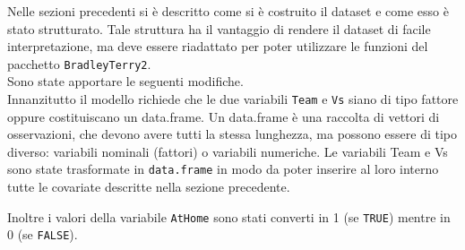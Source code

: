 Nelle sezioni precedenti si è descritto come si è costruito il dataset e come esso è stato strutturato. Tale struttura ha il vantaggio di rendere il dataset di facile interpretazione, ma deve essere riadattato per poter utilizzare le funzioni del pacchetto \texttt{BradleyTerry2}.\\ 
Sono state apportare le seguenti modifiche.\\

Innanzitutto il modello richiede che le due variabili \texttt{Team} e \texttt{Vs} siano di tipo fattore oppure costituiscano un \textsf{data.frame}. Un \textsf{data.frame} è una raccolta di vettori di osservazioni, che devono avere tutti la stessa lunghezza, ma possono essere di tipo diverso: variabili nominali (fattori) o variabili numeriche.
Le variabili \textsf{Team} e \textsf{Vs} sono state trasformate in \texttt{data.frame} in modo da poter inserire al loro interno tutte le covariate descritte nella sezione precedente.

Inoltre  i valori della variabile \texttt{AtHome} sono stati converti in 1 (se \texttt{TRUE}) mentre in 0 (se \texttt{FALSE}).








